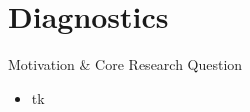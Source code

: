 \section{Diagnostics}

\begin{frame}{Motivation \& Core Research Question}
  \begin{itemize}
    \item tk
  \end{itemize}
\end{frame}
